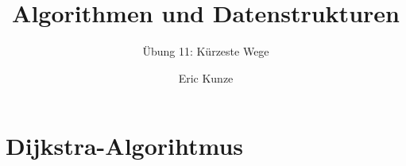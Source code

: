 \documentclass{beamer}
\begin{document}
	\title{Algorithmen und Datenstrukturen}
	\subtitle{Übung 11: Kürzeste Wege}
	\author{Eric Kunze}
	\date{}

	\maketitle






\section{Dijkstra-Algorihtmus}
\end{document}
